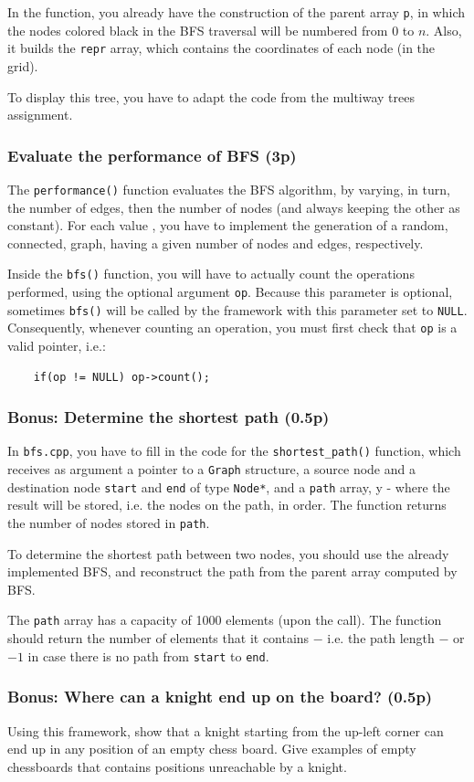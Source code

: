 \documentclass[../en-fa-lab.tex]{subfiles}
\begin{document}
In the function, you already have the construction of the parent array \texttt{p}, in which the nodes colored black in the BFS traversal will be numbered from $0$ to $n$. Also, it builds the \texttt{repr} array, which contains the coordinates of each node (in the grid).

To display this tree, you have to adapt the code from the multiway trees assignment.


\subsubsection{Evaluate the performance of BFS (3p)}
The \texttt{performance()} function evaluates the BFS algorithm, by varying, in turn, the number of edges, then the number of nodes (and always keeping the other as constant). For each value , you have to implement the generation of a random, connected, graph, having a given number of nodes and edges, respectively.

Inside the \texttt{bfs()} function, you will have to actually count the operations performed, using the optional argument \texttt{op}. Because this parameter is optional, sometimes \texttt{bfs()} will be called by the framework with this parameter set to \texttt{NULL}. Consequently, whenever counting an operation, you must first check that \texttt{op} is a valid pointer, i.e.:
\begin{verbatim}
    if(op != NULL) op->count();
\end{verbatim}

\subsubsection{Bonus: Determine the shortest path (0.5p)}
In \texttt{bfs.cpp}, you have to fill in the code for the \texttt{shortest\_path()} function, which receives as argument a pointer to a \texttt{Graph} structure, a source node and a destination node \texttt{start} and \texttt{end} of type \texttt{Node*}, and a \texttt{path} array, y - where the result will be stored, i.e. the nodes on the path, in order. The function returns the number of nodes stored in  \texttt{path}.

To determine the shortest path between two nodes, you should use the already implemented BFS, and reconstruct the path from the parent array computed by BFS.

The \texttt{path} array has a capacity of 1000 elements (upon the call). The function should return the number of elements that it contains  $-$  i.e. the path length $-$ or $-1$ in case there is no path from \texttt{start} to \texttt{end}.

\subsubsection{Bonus: Where can a knight end up on the board? (0.5p)}
Using this framework, show that a knight starting from the up-left corner can end up in any position of an empty chess board. Give examples of empty chessboards that contains positions unreachable by a knight.
\end{document}

